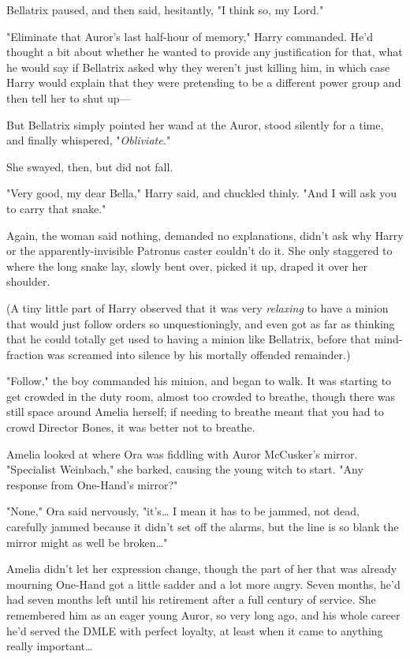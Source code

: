 Bellatrix paused, and then said, hesitantly, "I think so, my Lord."

"Eliminate that Auror's last half-hour of memory," Harry commanded. He'd 
thought a bit about whether he wanted to provide any justification for that, 
what he would say if Bellatrix asked why they weren't just killing him, in 
which case Harry would explain that they were pretending to be a different 
power group and then tell her to shut up---

But Bellatrix simply pointed her wand at the Auror, stood silently for a time, 
and finally whispered, "\emph{Obliviate.}"

She swayed, then, but did not fall.

"Very good, my dear Bella," Harry said, and chuckled thinly. "And I will ask 
you to carry that snake."

Again, the woman said nothing, demanded no explanations, didn't ask why Harry 
or the apparently-invisible Patronus caster couldn't do it. She only staggered 
to where the long snake lay, slowly bent over, picked it up, draped it over her 
shoulder.

(A tiny little part of Harry observed that it was very \emph{relaxing} to have 
a minion that would just follow orders so unquestioningly, and even got as far 
as thinking that he could totally get used to having a minion like Bellatrix, 
before that mind-fraction was screamed into silence by his mortally offended 
remainder.)

"Follow," the boy commanded his minion, and began to walk.
\sbreak
It was starting to get crowded in the duty room, almost too crowded to breathe, 
though there was still space around Amelia herself; if needing to breathe meant 
that you had to crowd Director Bones, it was better not to breathe.

Amelia looked at where Ora was fiddling with Auror McCusker's mirror. 
"Specialist Weinbach," she barked, causing the young witch to start. "Any 
response from One-Hand's mirror?"

"None," Ora said nervously, "it's{\ldots} I mean it has to be jammed, not dead, 
carefully jammed because it didn't set off the alarms, but the line is so blank 
the mirror might as well be broken{\ldots}"

Amelia didn't let her expression change, though the part of her that was 
already mourning One-Hand got a little sadder and a lot more angry. Seven 
months, he'd had seven months left until his retirement after a full century of 
service. She remembered him as an eager young Auror, so very long ago, and his 
whole career he'd served the DMLE with perfect loyalty, at least when it came 
to anything really important{\ldots}

